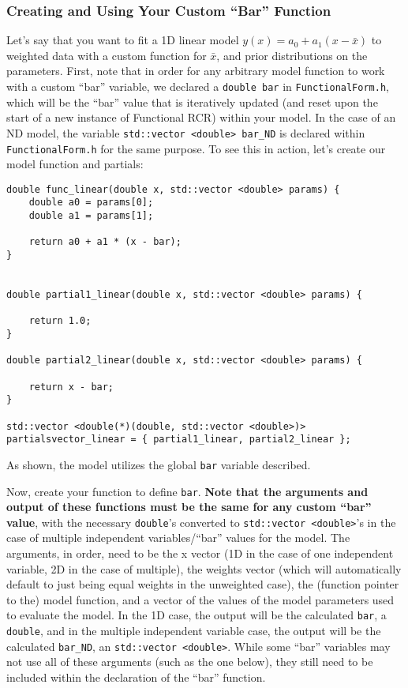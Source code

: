 \documentclass[12pt]{article}
\newcommand{\li}{\lstinline}
\begin{document}
\subsubsection{Creating and Using Your Custom ``Bar'' Function}
\par Let's say that you want to fit a 1D linear model $y(x) = a_0 + a_1(x-\bar{x})$ to weighted data with a custom function for $\bar{x}$, and prior distributions on the parameters. First, note that in order for any arbitrary model function to work with a custom ``bar'' variable, we declared a \li{double bar} in \li{FunctionalForm.h}, which will be the ``bar'' value that is iteratively updated (and reset upon the start of a new instance of Functional RCR) within your model. In the case of an ND model, the variable \li{std::vector <double> bar_ND} is declared within \li{FunctionalForm.h} for the same purpose. To see this in action, let's create our model function and partials:
\begin{lstlisting}
double func_linear(double x, std::vector <double> params) {
	double a0 = params[0];
	double a1 = params[1];

	return a0 + a1 * (x - bar);
}


double partial1_linear(double x, std::vector <double> params) {

	return 1.0;
}

double partial2_linear(double x, std::vector <double> params) {

	return x - bar;
}

std::vector <double(*)(double, std::vector <double>)> partialsvector_linear = { partial1_linear, partial2_linear };
\end{lstlisting}
As shown, the model utilizes the global \li{bar} variable described.
\par Now, create your function to define \li{bar}. \textbf{Note that the arguments and output of these functions must be the same for any custom ``bar'' value}, with the necessary \li{double}'s converted to \li{std::vector <double>}'s in the case of multiple independent variables/``bar'' values for the model. The arguments, in order, need to be the x vector (1D in the case of one independent variable, 2D in the case of multiple), the weights vector (which will automatically default to just being equal weights in the unweighted case), the (function pointer to the) model function, and a vector of the values of the model parameters used to evaluate the model. In the 1D case, the output will be the calculated \li{bar}, a \li{double}, and in the multiple independent variable case, the output will be the calculated \li{bar_ND}, an \li{std::vector <double>}. While some ``bar'' variables may not use all of these arguments (such as the one below), they still need to be included within the declaration of the ``bar'' function.
\end{document}
